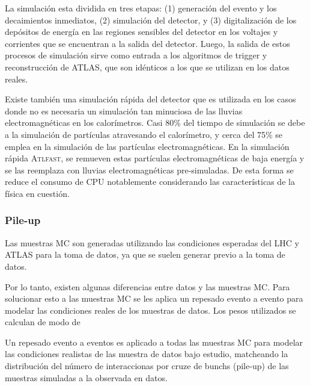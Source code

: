 La simulación esta dividida en tres etapas: (1) generación del evento y los
decaimientos inmediatos, (2) simulación del detector, y (3) digitalización de
los depósitos de energía en las regiones sensibles del detector en los voltajes
y corrientes que se encuentran a la salida del detector. Luego, la salida de
estos procesos de simulación sirve como entrada a los algoritmos de
trigger y reconstrucción de ATLAS, que son idénticos a los que se utilizan en
los datos reales.

Existe también una simulación rápida del detector que es utilizada en los casos
donde no es necesaria un simulación tan minuciosa de las lluvias
electromagnéticas en los calorímetros. Casi 80\% del tiempo de simulación se
debe a la simulación de partículas atravesando el calorímetro, y cerca del 75\%
se emplea en la simulación de las partículas electromagnéticas. En la simulación
rápida \textsc{Atlfast}\cite{Richter-Was:683751}, se remueven estas partículas
electromagnéticas de baja energía y se las reemplaza con lluvias
electromagnéticas pre-simuladas. De esta forma se reduce el consumo de CPU
notablemente considerando las características de la física en cuestión.


\subsubsection{Pile-up}
\label{sec:prw}

Las muestras MC son generadas utilizando las condiciones esperadas del LHC y
ATLAS para la toma de datos, ya que se suelen generar previo a la toma de datos.

Por lo tanto, existen algunas diferencias entre datos y las muestras MC. Para
solucionar esto a las muestras MC se les aplica un repesado evento a evento
para modelar las condiciones reales de los muestras de datos. Los pesos
utilizados se calculan de modo de


Un repesado evento a eventos es aplicado a todas las muestras MC para modelar las condiciones
realistas de las muestra de datos bajo estudio, matcheando la distribución del número de interaccionas
por cruze de bunchs (pile-up) de las muestras simuladas a la observada en datos.



